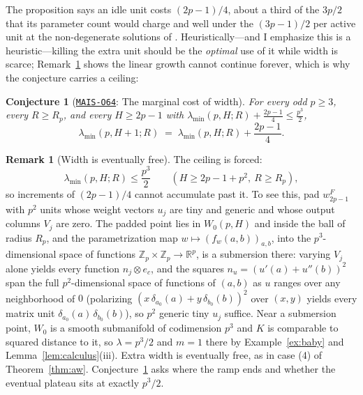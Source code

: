 \documentclass[11pt]{amsart}
\newcommand{\Oid}[1]{\href{https://github.com/lionellevine/MAIS/blob/main/open-problems/MAIS-O#1.md}{\texttt{MAIS-O#1}}}
\theoremstyle{plain}
\newtheorem{conjecture}[theorem]{Conjecture}
\theoremstyle{definition}
\newtheorem{remark}[theorem]{Remark}
\newcommand{\R}{\mathbb{R}}
\newcommand{\Z}{\mathbb{Z}}
\begin{document}
The proposition says an idle unit costs $(2p-1)/4$, about a third of the $3p/2$ that its parameter count would charge and well under the $(3p-1)/2$ per active unit at the non-degenerate solutions of \cite{cullen2026}. Heuristically---and I emphasize this is a heuristic---killing the extra unit should be the \emph{optimal} use of it while width is scarce; Remark~\ref{rem:ceiling} shows the linear growth cannot continue forever, which is why the conjecture carries a ceiling:

\begin{conjecture}[\Oid{64}: The marginal cost of width]\label{conj:increment}
For every odd $p \ge 3$, every $R \ge R_p$, and every $H \ge 2p-1$ with $\lambda_{\min}(p, H; R) + \frac{2p-1}{4} \le \frac{p^3}{2}$,
\[
   \lambda_{\min}(p, H+1; R) \;=\; \lambda_{\min}(p, H; R) + \frac{2p-1}{4}.
\]
\end{conjecture}

\begin{remark}[Width is eventually free]\label{rem:ceiling}
The ceiling is forced:
\[
 \lambda_{\min}(p,H;R)\le \frac{p^3}{2}
 \qquad
 (H\ge 2p-1+p^2,\ R\ge R_p),
\]
so increments of $(2p-1)/4$ cannot accumulate past it. To see this, pad $w^F_{2p-1}$ with $p^2$ units whose weight vectors $u_j$ are tiny and generic and whose output columns $V_j$ are zero. The padded point lies in $W_0(p,H)$ and inside the ball of radius $R_p$, and the parametrization map $w \mapsto (f_w(a,b))_{a,b}$, into the $p^3$-dimensional space of functions $\Z_p \times \Z_p \to \R^p$, is a submersion there: varying $V_j$ alone yields every function $n_j \otimes e_c$, and the squares $n_u = (u'(a)+u''(b))^2$ span the full $p^2$-dimensional space of functions of $(a,b)$ as $u$ ranges over any neighborhood of $0$ (polarizing $(x\,\delta_{a_0}(a) + y\,\delta_{b_0}(b))^2$ over $(x,y)$ yields every matrix unit $\delta_{a_0}(a)\,\delta_{b_0}(b)$), so $p^2$ generic tiny $u_j$ suffice. Near a submersion point, $W_0$ is a smooth submanifold of codimension $p^3$ and $K$ is comparable to squared distance to it, so $\lambda = p^3/2$ and $m = 1$ there by Example~\ref{ex:baby} and Lemma~\ref{lem:calculus}(iii). Extra width is eventually free, as in case (4) of Theorem~\ref{thm:aw}. Conjecture~\ref{conj:increment} asks where the ramp ends and whether the eventual plateau sits at exactly $p^3/2$.
\end{remark}
\end{document}
